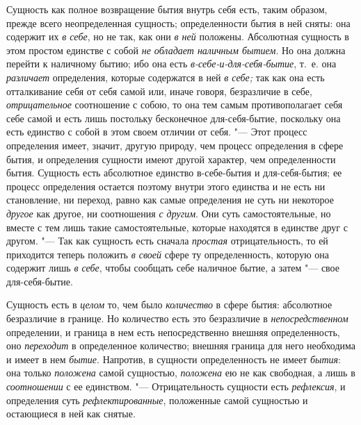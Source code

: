 Сущность как полное возвращение бытия внутрь себя есть, таким образом,
прежде всего неопределенная сущность; определенности бытия в ней сняты: она
содержит их {\em в себе}, но не так, как они
{\em в ней} положены. Абсолютная сущность в этом
простом единстве с собой {\em не обладает наличным
бытием}. Но она должна перейти к наличному бытию; ибо она есть
{\em в-себе-и-для-себя-бытие}, т.~е. она
{\em различает} определения, которые содержатся в ней
{\em в себе;} так как она есть отталкивание себя от
себя самой или, иначе говоря, безразличие в себе,
{\em отрицательное} соотношение с собою, то она тем
самым противополагает себя себе самой и есть лишь постольку бесконечное
для-себя-бытие, поскольку она есть единство с собой в этом своем отличии от
себя. "--- Этот процесс определения имеет, значит, другую природу, чем процесс
определения в сфере бытия, и определения сущности имеют другой характер,
чем определенности бытия. Сущность есть абсолютное единство в-себе-бытия и
для-себя-бытия; ее процесс определения остается поэтому внутри этого
единства и не есть ни становление, ни переход, равно как самые определения
не суть ни некоторое {\em другое} как другое, ни
соотношения {\em с другим}. Они суть самостоятельные,
но вместе с тем лишь такие самостоятельные, которые находятся в единстве
друг с другом. "--- Так как сущность есть сначала
{\em простая} отрицательность, то ей приходится теперь
положить {\em в своей} сфере ту определенность, которую
она содержит лишь {\em в себе}, чтобы сообщать себе
наличное бытие, а затем "--- свое для-себя-бытие.

Сущность есть в {\em целом} то, чем было
{\em количество} в сфере бытия: абсолютное безразличие
в границе. Но количество есть это безразличие в
{\em непосредственном} определении, и граница в нем
есть непосредственно внешняя определенность, оно
{\em переходит} в определенное количество; внешняя
граница для него необходима и имеет в нем {\em бытие}.
Напротив, в сущности определенность не имеет
{\em бытия}: она только
{\em положена} самой сущностью,
{\em положена} ею не как свободная, а лишь в
{\em соотношении} с ее единством. "--- Отрицательность
сущности есть {\em рефлексия}, и определения суть
{\em рефлектированные}, положенные самой сущностью и
остающиеся в ней как снятые.


